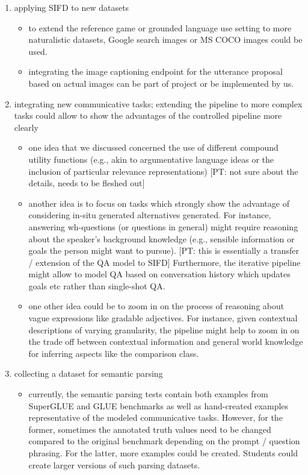 \documentclass[fleqn,reqno,10pt]{article}
\newcommand{\pt}[1]{\textcolor{CSP-accent-1}{[PT: #1]}}
\begin{document}
\begin{enumerate}
    \item applying SIFD to new datasets
        \begin{itemize}
            \item to extend the reference game or grounded language use setting to more naturalistic datasets, Google search images or MS COCO images could be used.
            \item integrating the image captioning endpoint for the utterance proposal based on actual images can be part of project or be implemented by us.
        \end{itemize}
    \item integrating new communicative tasks; extending the pipeline to more complex tasks could allow to show the advantages of the controlled pipeline more clearly
        \begin{itemize}
            \item one idea that we discussed concerned the use of different compound utility functions (e.g., akin to argumentative language ideas or the inclusion of particular relevance representations) \pt{not sure about the details, needs to be fleshed out}
            \item another idea is to focus on tasks which strongly show the advantage of considering in-situ generated alternatives generated. For instance, answering wh-questions (or questions in general) might require reasoning about the speaker's background knowledge (e.g., sensible information or goals the person might want to pursue). \pt{this is essentially a transfer / extension of the QA model to SIFD} Furthermore, the iterative pipeline might allow to model QA based on conversation history which updates goals etc rather than single-shot QA.
            \item one other idea could be to zoom in on the process of reasoning about vague expressions like gradable adjectives. For instance, given contextual descriptions of varying granularity, the pipeline might help to zoom in on the trade off between contextual information and general world knowledge for inferring aspects like the comparison class.
        \end{itemize}
    \item collecting a dataset for semantic parsing
        \begin{itemize}
            \item currently, the semantic parsing tests contain both examples from SuperGLUE and GLUE benchmarks as well as hand-created examples representative of the modeled communicative tasks. However, for the former, sometimes the annotated truth values need to be changed compared to the original benchmark depending on the prompt / question phrasing. For the latter, more examples could be created. Students could create larger versions of such parsing datasets.

\end{itemize}
\end{enumerate}
\end{document}
